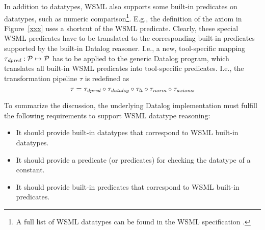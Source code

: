 In addition to datatypes, WSML also supports some built-in predicates on datatypes, such as
numeric comparison\footnote{A full list of WSML datatypes can be
found in the WSML specification \cite{wsml-spec}.}. E.g., the
definition of the  axiom in Figure~\ref{xxx} uses a shortcut of the WSML
 predicate. Clearly, these special WSML
predicates have to be translated to the corresponding built-in
predicates supported by the built-in Datalog reasoner. I.e., a new, tool-specific
mapping $\tau_{\textit{dpred}} : \mathcal{P} \mapsto \mathcal{P}$ has to be applied to the generic Datalog program, which translates all built-in WSML predicates into tool-specific predicates. I.e., the transformation pipeline $\tau$ is redefined as
\begin{displaymath}
    \tau = \tau_{\textit{dpred}} \circ \tau_{\textit{datalog}} \circ \tau_{\textit{lt}} \circ \tau_{\textit{norm}} \circ \tau_{\textit{axioms}}
\end{displaymath}

To summarize the discussion, the underlying Datalog implementation
must fulfill the following requirements to support WSML datatype
reasoning:
\begin{itemize}
    \item It should provide built-in datatypes that correspond to WSML built-in datatypes.
    \item It should provide a predicate (or predicates) for checking the datatype of a constant.
    \item It should provide built-in predicates that correspond to WSML built-in predicates.
\end{itemize}

